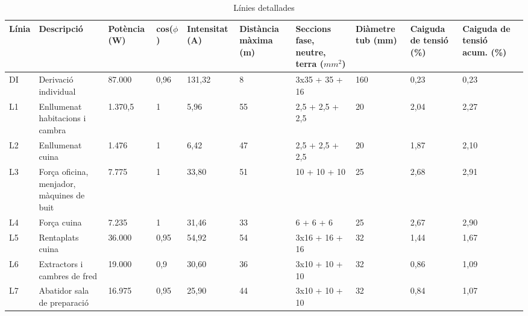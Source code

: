 \begin{table}[H]
\scriptsize
\begin{center}
 \begin{tabu} to \textwidth {|X[0.5, l]|X[2, l]|X[r]|X[0.6, r]|X[r]|X[r]|X[r]|X[r]|X[r]|X[r]|X[0.5,r]|}%
 \hline
 Línia& Descripció & Potència (W) & cos($\phi$) & Intensitat (A) & Distància màxima (m) & Seccions fase, neutre, terra ($mm^{2}$) & Diàmetre tub (mm) & Caiguda de tensió (\%) & Caiguda de tensió acum. (\%)\\
 \hline \hline 
DI & Derivació individual& 87.000 \ \ \ \ & 0,96 & 131,32 & 8 &3x35 + 35 + 16& 160 & 0,23 & 0,23 \\ \hline
L1 & Enllumenat habitacions i cambra& 1.370,5 & 1 & 5,96 & 55 &2,5 + 2,5 + 2,5& 20 & 2,04 & 2,27 \\ \hline
L2 & Enllumenat cuina & 1.476 \ \ \ \  & 1 & 6,42 & 47 &2,5 + 2,5 + 2,5& 20 & 1,87 & 2,10 \\ \hline 
L3 & Força oficina, menjador, màquines de buit & 7.775 \ \ \ \  & 1 & 33,80 & 51 &10 + 10 + 10& 25 & 2,68 & 2,91 \\ \hline 
L4 & Força cuina & 7.235 \ \ \ \  & 1 & 31,46 & 33 & 6 + 6 + 6& 25 & 2,67 & 2,90 \\ \hline
L5 & Rentaplats cuina & 36.000 \ \ \ \ & 0,95 & 54,92 & 54 &3x16 + 16 + 16& 32 & 1,44 & 1,67 \\ \hline 
L6 & Extractors i cambres de fred & 19.000 \ \ \ \ & 0,9 & 30,60 & 36 &3x10 + 10 + 10& 32 & 0,86 & 1,09 \\ \hline
L7 & Abatidor sala de preparació & 16.975 \ \ \ \ & 0,95 & 25,90 & 44 &3x10 + 10 + 10& 32 & 0,84 & 1,07 \\ \hline

 \end{tabu}
 \caption{Línies detallades}
\end{center}
\end{table}


